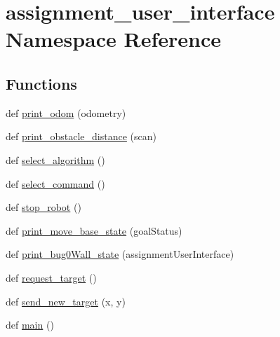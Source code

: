 \hypertarget{namespaceassignment__user__interface}{}\section{assignment\+\_\+user\+\_\+interface Namespace Reference}
\label{namespaceassignment__user__interface}
\subsection*{Functions}
\begin{DoxyCompactItemize}
\item 
def \hyperlink{namespaceassignment__user__interface_ae90fd67c15d84a2575d124d9238cf7f6}{print\+\_\+odom} (odometry)
\item 
def \hyperlink{namespaceassignment__user__interface_a249d47742744baac8863e4879d2fb194}{print\+\_\+obstacle\+\_\+distance} (scan)
\item 
def \hyperlink{namespaceassignment__user__interface_ae614cd2ec833af936cee545db6346780}{select\+\_\+algorithm} ()
\item 
def \hyperlink{namespaceassignment__user__interface_a84f6d19bde89c7e5c70cbfbfb0d4cbe9}{select\+\_\+command} ()
\item 
def \hyperlink{namespaceassignment__user__interface_aa5f3245814403aa62b6b67df83325402}{stop\+\_\+robot} ()
\item 
def \hyperlink{namespaceassignment__user__interface_a9b4df06215c60583814ac704d4072dba}{print\+\_\+move\+\_\+base\+\_\+state} (goal\+Status)
\item 
def \hyperlink{namespaceassignment__user__interface_ac83d08c7321d1e842f4da43c047f286c}{print\+\_\+bug0\+Wall\+\_\+state} (assignment\+User\+Interface)
\item 
def \hyperlink{namespaceassignment__user__interface_a6919be12c76c558bd0deed9cb434d66c}{request\+\_\+target} ()
\item 
def \hyperlink{namespaceassignment__user__interface_a865406d5310c5f253a4746dbc64bb298}{send\+\_\+new\+\_\+target} (x, y)
\item 
def \hyperlink{namespaceassignment__user__interface_af987e7fa29104f69b6953a02f48fceae}{main} ()
\end{DoxyCompactItemize}
